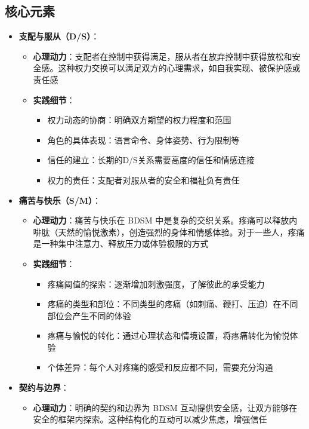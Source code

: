 \documentclass[12pt,UTF8]{ctexbook}
\begin{document}
\subsection{核心元素}
  \begin{itemize}
  \item \textbf{支配与服从（D/S）}：
    \begin{itemize}
    \item \textbf{心理动力}：支配者在控制中获得满足，服从者在放弃控制中获得放松和安全感。这种权力交换可以满足双方的心理需求，如自我实现、被保护感或责任感
    \item \textbf{实践细节}：
      \begin{itemize}
      \item 权力动态的协商：明确双方期望的权力程度和范围
      \item 角色的具体表现：语言命令、身体姿势、行为限制等
      \item 信任的建立：长期的D/S关系需要高度的信任和情感连接
      \item 权力的责任：支配者对服从者的安全和福祉负有责任
      \end{itemize}
    \end{itemize}
  \item \textbf{痛苦与快乐（S/M）}：
    \begin{itemize}
    \item \textbf{心理动力}：痛苦与快乐在 BDSM 中是复杂的交织关系。疼痛可以释放内啡肽（天然的愉悦激素），创造强烈的身体和情感体验。对于一些人，疼痛是一种集中注意力、释放压力或体验极限的方式
    \item \textbf{实践细节}：
      \begin{itemize}
      \item 疼痛阈值的探索：逐渐增加刺激强度，了解彼此的承受能力
      \item 疼痛的类型和部位：不同类型的疼痛（如刺痛、鞭打、压迫）在不同部位会产生不同的体验
      \item 疼痛与愉悦的转化：通过心理状态和情境设置，将疼痛转化为愉悦体验
      \item 个体差异：每个人对疼痛的感受和反应都不同，需要充分沟通
      \end{itemize}
    \end{itemize}
  \item \textbf{契约与边界}：
    \begin{itemize}
    \item \textbf{心理动力}：明确的契约和边界为 BDSM 互动提供安全感，让双方能够在安全的框架内探索。这种结构化的互动可以减少焦虑，增强信任

\end{itemize}
\end{itemize}
\end{document}
